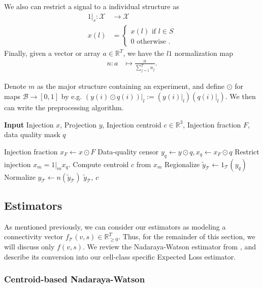 We also can restrict a signal to a individual structure as
\begin{eqnarray*}
1 |_s :  \mathcal X &\to  \mathcal X \\
 x(l) &= \begin{cases} 
 x(l) \text{ if } l \in S \\
 0 \text{ otherwise }.
 \end{cases}
\end{eqnarray*}
Finally, given a vector or array $a \in \mathbb R^T$, we have the $l1$ normalization map
\begin{eqnarray*}
n: a &\mapsto \frac{a}{\sum_{j = 1}^T a_j}.
\end{eqnarray*}

Denote $m$ as the major structure containing an experiment, and define $\odot$ for maps $\mathcal B \to [0,1]$ by e.g.
 $( y(i) \odot q(i)) |_l := ( y(i)  |_l) ( q(i) |_l )$.
 We then can write the preprocessing algorithm.

\begin{algorithm}[H]
\caption{{\bf Input} Injection $x$, Projection $y$, Injection centroid $c \in \mathbb R^3$, Injection fraction $F$, data quality mask $q$}
\label{alg:preprocess}
\begin{algorithmic}
\State Injection fraction $x_F \gets x\odot F$
\State Data-quality censor $y_q \gets  y \odot q , x_q \gets x_F \odot q$
\State Restrict injection $x_{m} = 1 |_{m} x_q $.
\State Compute centroid $c$ from $x_m $
\State Regionalize $\tilde y_{\mathcal T}  \gets 1_{\mathcal T}(  y_q)$
\State Normalize $ y_{\mathcal T}  \gets n(\tilde y_{\mathcal T}  )$
 $\tilde y_{\mathcal T} $, $c$ 
\end{algorithmic}
\end{algorithm}

\newpage
\subsection{Estimators}
\label{supp_sec:estimators}

As mentioned previously, we can consider our estimators as modeling a connectivity vector $f_{\mathcal T} (v,s)  \in \mathbb R_{\geq 0}^T$.
Thus, for the remainder of this section, we will discuss only $f (v,s)$.
We review the Nadaraya-Watson estimator from  \citet{Knox2019-ot}, and describe its conversion into our cell-class specific Expected Loss estimator.

\subsubsection{Centroid-based Nadaraya-Watson}

